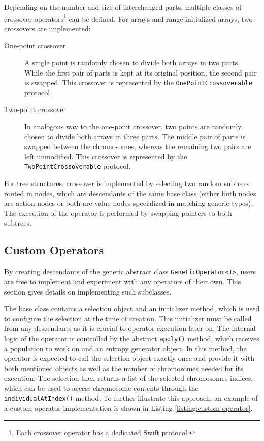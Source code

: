 Depending on the number and size of interchanged parts, multiple classes of crossover operators\footnote{Each crossover operator has a dedicated Swift protocol.} can be defined. For arrays and range-initialized arrays, two crossovers are implemented:
~
\begin{description}
	\item[One-point crossover]
	A single point is randomly chosen to divide both arrays in two parts. While the first pair of parts is kept at its original position, the second pair is swapped. This crossover is represented by the \texttt{OnePointCrossoverable} protocol.

	\item[Two-point crossover]
	In analogous way to the one-point crossover, two points are randomly chosen to divide both arrays in three parts. The middle pair of parts is swapped between the chromosomes, whereas the remaining two pairs are left unmodified. This crossover is represented by the \texttt{TwoPointCrossoverable} protocol.
\end{description}

For tree structures, crossover is implemented by selecting two random subtrees rooted in nodes, which are descendants of the same base class (either both nodes are action nodes or both are value nodes specialized in matching generic types). The execution of the operator is performed by swapping pointers to both subtrees.

\subsection{Custom Operators}\label{section:custom-operators}
By creating descendants of the generic abstract class \texttt{GeneticOperator<T>}, users are free to implement and experiment with any operators of their own. This section gives details on implementing such subclasses.

The base class contains a selection object and an initializer method, which is used to configure the selection at the time of creation. This initializer must be called from any descendants as it is crucial to operator execution later on. The internal logic of the operator is controlled by the abstract \texttt{apply()} method, which receives a population to work on and an entropy generator object. In this method, the operator is expected to call the selection object exactly once and provide it with both mentioned objects as well as the number of chromosomes needed for its execution. The selection then returns a list of the selected chromosomes indices, which can be used to access chromosome contents through the \texttt{individualAtIndex()} method. To further illustrate this approach, an example of a custom operator implementation is shown in Listing \ref{listing:custom-operator}.

